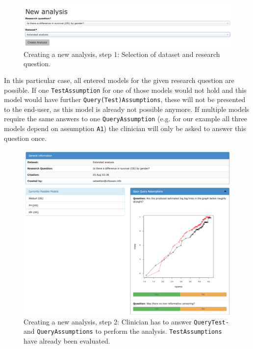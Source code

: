 \begin{figure}[!ht]
	\centering
	\includegraphics[width=\textwidth]{figures/ui_analysis_0}
	\caption{Creating a new analysis, step 1: Selection of dataset and research question. }
	\label{fig:analysis:1}
\end{figure}

In this particular case, all entered models for the given research question are possible. If one \texttt{TestAssumption} for one of those models would not hold and this model would have further \texttt{Query(Test)Assumptions}, these will not be presented to the end-user, as this model is already not possible anymore. If multiple models require the same answers to one \texttt{QueryAssumption} (e.g. for our example all three models depend on assumption \texttt{A1}) the clinician will only be asked to answer this question once. 

\begin{figure}[!hb]
	\centering
	\includegraphics[width=\textwidth]{figures/ui_analysis_1}
	\caption{Creating a new analysis, step 2: Clinician has to answer \texttt{QueryTest-} and \texttt{QueryAssumptions} to perform the analysis. \texttt{TestAssumptions} have already been evaluated.}
	\label{fig:analysis:2}
\end{figure}


